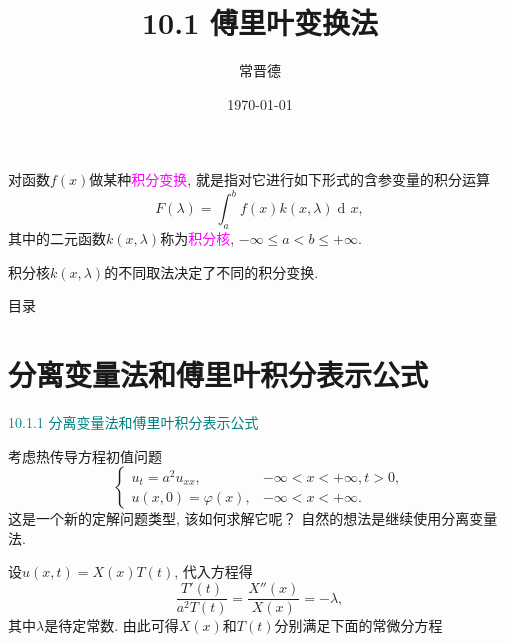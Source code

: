 \documentclass[aspectratio=169,notheorems,12pt,compress,UTF8]{ctexbeamer} %
\title{10.1 傅里叶变换法}
\author{常晋德}
\institute{中国海洋大学数学科学学院}
\date{\today}
\DeclareMathOperator\dif{d\!}
\newcommand{\spb}{\vspace{3mm}}
\newcommand{\mpb}{\vspace{5mm}}
\begin{document}
\begin{frame}
\begin{center}
\end{center}

\mpb\songti\qquad 对函数$f(x)$做某种\textcolor{magenta}{积分变换}, 就是指对它进行如下形式的含参变量的积分运算
$$
F(\lambda)=\int_a^b f(x)k(x,\lambda)\dif x,
$$
其中的二元函数$k(x,\lambda)$称为\textcolor{magenta}{积分核}, $-\infty\leq a<b\leq+\infty$.

\begin{center}
\end{center}

积分核$k(x,\lambda)$的不同取法决定了不同的积分变换.
\end{frame}


\begin{frame}
\titlepage
\end{frame}

\begin{frame}{目录}
\tableofcontents
\end{frame}

\songti

\section{分离变量法和傅里叶积分表示公式}
\begin{frame}
\textcolor{teal}{10.1.1 分离变量法和傅里叶积分表示公式}\mpb

\qquad 考虑热传导方程初值问题
\begin{equation}\label{10.1}
\left\{
\begin{array}{ll}
u_{t}=a^2u_{xx}, & -\infty<x<+\infty,t>0,\\
u(x,0)=\varphi(x), & -\infty<x<+\infty.
\end{array}\right.
\end{equation}
这是一个新的定解问题类型, 该如何求解它呢？\pause
自然的想法是继续使用分离变量法.\pause\spb

\qquad 设$u(x,t)=X(x)T(t)$, 代入方程得
$$
\frac{T'(t)}{a^2T(t)}=\frac{X''(x)}{X(x)}=-\lambda,
$$
其中$\lambda$是待定常数. 由此可得$X(x)$和$T(t)$分别满足下面的常微分方程
\end{frame}
\end{document}
